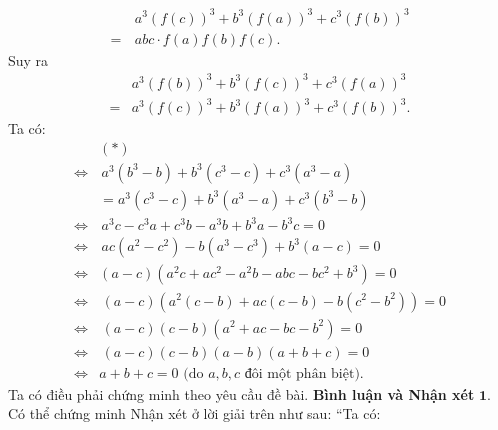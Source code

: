 \begin{multicols}{2}
	\begin{align*}
		&{a^3}{\left( {f\left( c \right)} \right)^3} + {b^3}{\left( {f\left( a \right)} \right)^3} + {c^3}{\left( {f\left( b \right)} \right)^3} \\[-0.4ex]
		=\,& abc \cdot f\left( a \right)f\left( b \right)f\left( c \right).
	\end{align*}
	Suy ra
	\begin{align*}
		&{a^3}{\left( {f\left( b \right)} \right)^3} + {b^3}{\left( {f\left( c \right)} \right)^3} + {c^3}{\left( {f\left( a \right)} \right)^3}\\[-0.4ex]
		 = &{a^3}{\left( {f\left( c \right)} \right)^3} + {b^3}{\left( {f\left( a \right)} \right)^3} + {c^3}{\left( {f\left( b \right)} \right)^3}.
	\end{align*}
	Ta có:
	\begin{align*}
		&(*) \\
		\Leftrightarrow&\, {a^3}\left( {{b^3} - b} \right) + {b^3}\left( {{c^3} - c} \right) + {c^3}\left( {{a^3} - a} \right) \\[-0.4ex]
		&= {a^3}( {{c^3} - c}) + {b^3}( {{a^3} - a} ) + {c^3}( {{b^3} - b})\\[-0.4ex]
		\Leftrightarrow&\, {a^3}c - {c^3}a + {c^3}b - {a^3}b + {b^3}a - {b^3}c = 0\\[-0.4ex]
		\Leftrightarrow&\, ac( {{a^2} \!-\! {c^2}} ) \!-\! b( {{a^3} \!-\! {c^3}}) \!+\! {b^3}( {a \!-\! c} ) \!=\! 0\\[-0.4ex]
		\Leftrightarrow& ( \!{a \!-\! c}\!)\!(\! {{a^2}c \!+\! a{c^2} \!-\! {a^2}b \!-\! abc \!-\! b{c^2} \!+\! {b^3}} \!) \!=\! 0\\[-0.4ex]
		\Leftrightarrow &\,(\! {a \!-\! c}\!)\!(\! {a^2}( {c \!-\! b}\! ) \!+\! ac(\! {c \!-\! b} \!) \!-\! b(\! {{c^2} \!-\! {b^2}}\!)\!) \!=\! 0\\[-0.4ex]
		\Leftrightarrow& \,\left( {a - c} \right)\left( {c - b} \right)\left( {{a^2} + ac - bc - {b^2}} \right) = 0\\[-0.4ex]
		\Leftrightarrow& \,\left( {a - c} \right)\left( {c - b} \right)\left( {a - b} \right)\left( {a + b + c} \right) = 0\\[-0.4ex]
		\Leftrightarrow& a \!+\! b \!+\! c \!=\! 0 \text{ (do $a,b,c$ đôi một phân biệt).}
	\end{align*}
	Ta có điều phải chứng minh theo yêu cầu đề bài.
	\vskip 0.05cm
	\textbf{\color{thachthuctoanhoc}Bình luận và Nhận xét}
	\vskip 0.05cm
	$\pmb{1.}$ Có thể chứng minh Nhận xét ở lời giải trên như sau:
	``Ta có:
	\begin{align*}

\end{align*}
\end{multicols}
